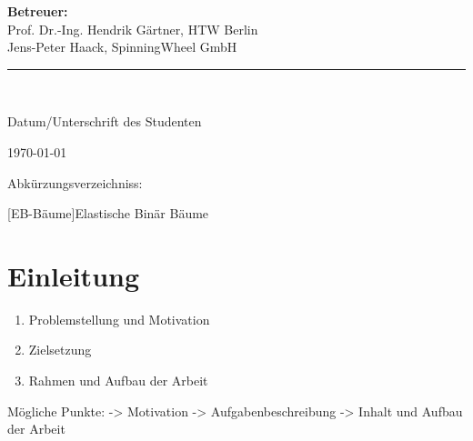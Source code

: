 \documentclass[a4paper,11pt,oneside,%
headsepline,												%
footsepline,												%
bibtotocnumbered									%
]{scrreprt}
\newcommand{\HRule}{\rule{\linewidth}{0.5mm}}
\begin{document}
\begin{titlepage}
\begin{center}
\begin{minipage}{0.4\textwidth}
\begin{flushright}
		\textbf{Betreuer:} \\
		Prof. Dr.-Ing. Hendrik Gärtner, HTW Berlin \\
		Jens-Peter Haack,  SpinningWheel GmbH
		\end{flushright}
	\end{minipage}
	
	
	 \vfill
	\HRule \\
	\begin{minipage}{0.4\textwidth}
		\begin{flushright} \large
	Datum/Unterschrift des Studenten
		\end{flushright}
	\end{minipage}
	
	\vfill
	{\large \today}
	\end{center}
	
\end{titlepage}
\tableofcontents
\newpage
{}
Abkürzungsverzeichniss:\\
\begin{acronym}[EB-Baum] %
 [EB-Bäume]{Elastische Binär Bäume}

\end{acronym}
\chapter{Einleitung}
 		\begin{enumerate}[1.]
			\item  Problemstellung und Motivation
			\item Zielsetzung
			\item Rahmen und Aufbau der Arbeit
		\end{enumerate}
		
	Mögliche Punkte:
	-> Motivation
	-> Aufgabenbeschreibung
	-> Inhalt und Aufbau der Arbeit	
		
\end{document}
